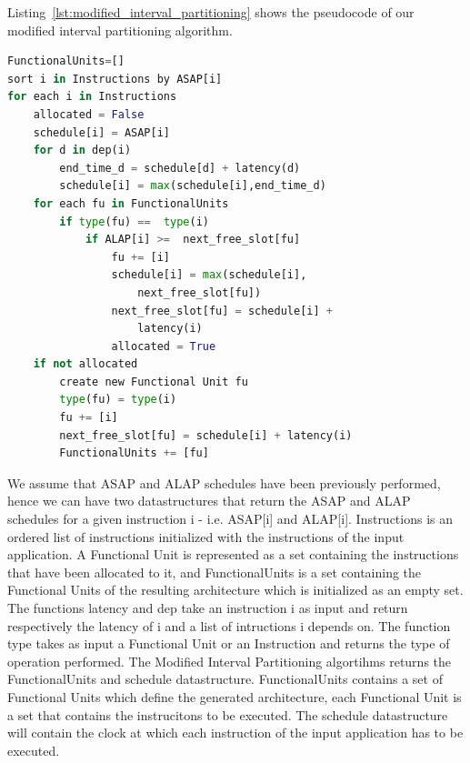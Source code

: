 Listing~\ref{lst:modified_interval_partitioning} shows the pseudocode of our modified interval partitioning algorithm. 
\begin{lstlisting}[language=Python, caption={Modified Interval Partitioning Algorithm}, label={lst:modified_interval_partitioning}]
FunctionalUnits=[]
sort i in Instructions by ASAP[i]
for each i in Instructions
	allocated = False
	schedule[i] = ASAP[i]
	for d in dep(i)
		end_time_d = schedule[d] + latency(d)
		schedule[i] = max(schedule[i],end_time_d)
	for each fu in FunctionalUnits 
		if type(fu) ==  type(i)
			if ALAP[i] >=  next_free_slot[fu]
				fu += [i]
				schedule[i] = max(schedule[i],
					next_free_slot[fu])
				next_free_slot[fu] = schedule[i] + 
					latency(i)
				allocated = True
	if not allocated
		create new Functional Unit fu
		type(fu) = type(i)
		fu += [i]
		next_free_slot[fu] = schedule[i] + latency(i)
		FunctionalUnits += [fu]

\end{lstlisting}
We assume that ASAP and ALAP schedules have been previously performed, hence we can have two datastructures that return the ASAP and ALAP schedules for a given instruction i - i.e. ASAP[i] and ALAP[i]. Instructions is an ordered list of instructions initialized with the instructions of the input application. A Functional Unit is represented as a set containing the instructions that have been allocated to it, and FunctionalUnits is a set containing the Functional Units of the resulting architecture which is initialized as an empty set. The functions latency and dep take an instruction i as input and return respectively the latency of i and a list of intructions i depends on. The function type
takes as input a Functional Unit or an Instruction and returns the type of operation performed.
The Modified Interval Partitioning algortihms returns the FunctionalUnits and schedule datastructure. FunctionalUnits contains a set of Functional Units which define the generated architecture, each Functional Unit is a set that contains the instrucitons to be executed. The schedule datastructure will contain the clock at which each instruction of the input application has to be executed.

